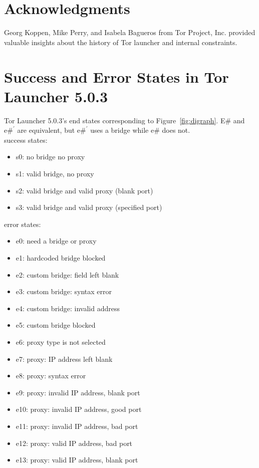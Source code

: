 \documentclass[USenglish,oneside,twocolumn]{article}
\begin{document}
\section {Acknowledgments}
Georg Koppen, Mike Perry, and Isabela Bagueros from Tor Project, Inc. provided valuable insights about the history of Tor launcher and internal constraints.




\appendix

\section{Success and Error States in Tor Launcher 5.0.3} 
\label{states} 
Tor Launcher 5.0.3's end states corresponding to Figure~\ref{fig:digraph}. E\# and $\mbox{e\#}^\prime$ are equivalent, but $\mbox{e\#}^\prime$ uses a bridge while e\# does not. \\

\noindent success states: 
\begin{itemize}
\item s0: no bridge no proxy
\item s1: valid bridge, no proxy
\item s2: valid bridge and valid proxy (blank port)
\item s3: valid bridge and valid proxy (specified port)
\end{itemize}

error states:
\begin{itemize} 
\item e0: need a bridge or proxy
\item e1: hardcoded bridge blocked
\item e2: custom bridge: field left blank
\item e3: custom bridge: syntax error
\item e4: custom bridge: invalid address
\item e5: custom bridge blocked
\item e6: proxy type is not selected
\item e7: proxy: IP address left blank
\item e8: proxy: syntax error
\item e9: proxy: invalid IP address, blank port
\item e10: proxy: invalid IP address, good port
\item e11: proxy: invalid IP address, bad port
\item e12: proxy: valid IP address, bad port
\item e13: proxy: valid IP address, blank port
\end{itemize} 
\end{document}
